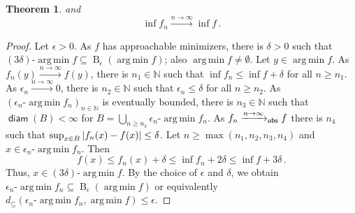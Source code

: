 \documentclass{scrartcl}
\renewcommand{\subset}{\subseteq}
\DeclareMathOperator{\diam}{\mathsf{diam}}
\DeclareMathOperator{\ball}{\mathrm{B}}
\newcommand{\N}{\mathbb{N}}
\newcommand{\equationFullstop}{\, .}
\newcommand{\eqfs}{\equationFullstop}
\DeclareMathOperator*{\argmin}{arg\,min}
\theoremstyle{plain}\newtheorem{theorem}{Theorem}[section]
\theoremstyle{definition}
\theoremstyle{remark}
\begin{document}
\begin{appendix}
\begin{theorem}
	and
	\begin{equation*}
		\inf f_n \xrightarrow{n\to\infty} \inf f
		\eqfs
	\end{equation*}
\end{theorem}
\begin{proof}
		Let $\epsilon >0$. As $f$ has approachable minimizers, there is $\delta > 0$ such that $(3\delta)\text{-}\argmin f \subset \ball_\epsilon(\argmin f)$; also $\argmin f \neq \emptyset$. Let $y\in\argmin f$. As $f_n(y) \xrightarrow{n\to\infty} f(y)$, there is $n_1\in\N$ such that $\inf f_n \leq \inf f + \delta$ for all $n \geq n_1$.		
		As $\epsilon_n \xrightarrow{n\to\infty} 0$, there is $n_2\in\N$ such that $\epsilon_n \leq \delta$ for all $n \geq n_2$.
		As $(\epsilon_n\text{-}\argmin f_n)_{n\in\N}$ is eventually bounded, there is $n_3\in\N$ such that $\diam(B) < \infty$ for $B = \bigcup_{n\geq n_3} \epsilon_n\text{-}\argmin f_n$.
		As $f_n \xrightarrow{n\to\infty}_{\mathsf{ubs}} f$ there is $n_4$ such that $\sup_{x\in B}\left| f_n(x) - f(x) \right| \leq \delta$.
		Let $n \geq \max(n_1, n_2, n_3, n_4)$ and $x \in \epsilon_n\text{-}\argmin f_n$. Then
		\begin{equation*}
			f(x) \leq f_n(x) + \delta \leq \inf f_n + 2\delta \leq \inf f + 3\delta\eqfs
		\end{equation*}
		Thus, $x \in (3\delta)\text{-}\argmin f$. By the choice of $\epsilon$ and $\delta$, we obtain $\epsilon_n\text{-}\argmin f_n \subset \ball_\epsilon(\argmin f)$ or equivalently $d_{\subset}(\epsilon_n\text{-}\argmin f_n, \argmin f) \leq \epsilon$.
		

\end{proof}
\end{appendix}
\end{document}

